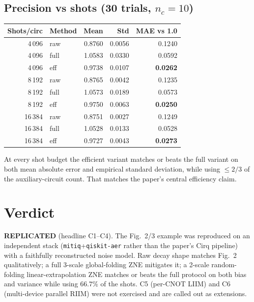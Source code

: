 \documentclass[11pt]{article}
\begin{document}
\subsection{Precision vs shots (30 trials, $n_c{=}10$)}
\begin{center}
\begin{tabular}{rlrrr}
\toprule
Shots/circ & Method & Mean & Std & MAE vs 1.0 \\
\midrule
4\,096  & raw & 0.8760 & 0.0056 & 0.1240 \\
4\,096  & full & 1.0583 & 0.0330 & 0.0592 \\
4\,096  & eff  & 0.9738 & 0.0107 & \textbf{0.0262} \\
8\,192  & raw & 0.8765 & 0.0042 & 0.1235 \\
8\,192  & full & 1.0573 & 0.0189 & 0.0573 \\
8\,192  & eff  & 0.9750 & 0.0063 & \textbf{0.0250} \\
16\,384 & raw & 0.8751 & 0.0027 & 0.1249 \\
16\,384 & full & 1.0528 & 0.0133 & 0.0528 \\
16\,384 & eff  & 0.9727 & 0.0043 & \textbf{0.0273} \\
\bottomrule
\end{tabular}
\end{center}
At every shot budget the efficient variant matches or beats the full variant on
both mean absolute error and empirical standard deviation, while using
$\le 2/3$ of the auxiliary-circuit count. That matches the paper's central
efficiency claim.

\section{Verdict}
\textbf{REPLICATED} (headline C1--C4).
The Fig.~2/3 example was reproduced on an independent stack
(\texttt{mitiq}+\texttt{qiskit-aer} rather than the paper's Cirq pipeline) with a
faithfully reconstructed noise model. Raw decay shape matches Fig.~2
qualitatively; a full 3-scale global-folding ZNE mitigates it; a 2-scale
random-folding linear-extrapolation ZNE matches or beats the full protocol on
both bias and variance while using $66.7\%$ of the shots. C5 (per-CNOT LIIM)
and C6 (multi-device parallel RIIM) were not exercised and are called out as
extensions.
\end{document}
